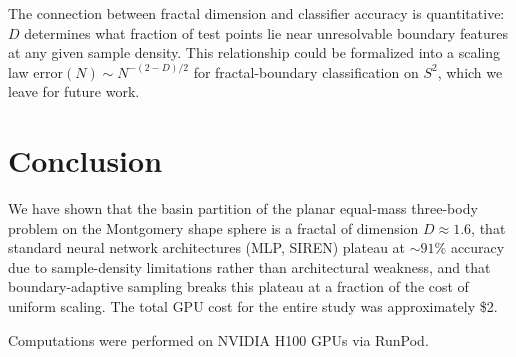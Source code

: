 \documentclass[twocolumn,prl]{revtex4-2}
\begin{document}
The connection between fractal dimension and classifier accuracy is
quantitative: $D$ determines what fraction of test points lie near
unresolvable boundary features at any given sample density. This
relationship could be formalized into a scaling law
$\mathrm{error}(N) \sim N^{-(2-D)/2}$ for fractal-boundary
classification on $S^2$, which we leave for future work.


\section{Conclusion}
\label{sec:conclusion}

We have shown that the basin partition of the planar equal-mass
three-body problem on the Montgomery shape sphere is a fractal of
dimension $D \approx 1.6$, that standard neural network architectures
(MLP, SIREN) plateau at ${\sim}91\%$ accuracy due to sample-density
limitations rather than architectural weakness, and that
boundary-adaptive sampling breaks this plateau at a fraction of the cost
of uniform scaling. The total GPU cost for the entire study was
approximately \$2.

\begin{acknowledgments}
Computations were performed on NVIDIA H100 GPUs via RunPod.
\end{acknowledgments}


\end{document}
